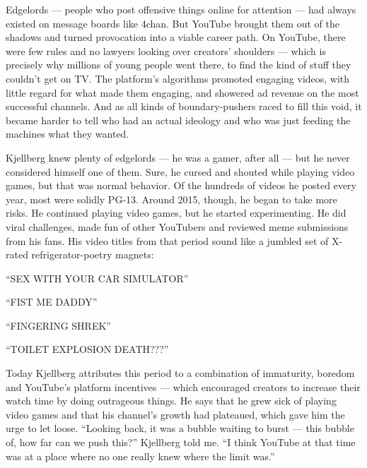 Edgelords --- people who post offensive things online for attention ---
had always existed on message boards like 4chan. But YouTube brought
them out of the shadows and turned provocation into a viable career
path. On YouTube, there were few rules and no lawyers looking over
creators' shoulders --- which is precisely why millions of young people
went there, to find the kind of stuff they couldn't get on TV. The
platform's algorithms promoted engaging videos, with little regard for
what made them engaging, and showered ad revenue on the most successful
channels. And as all kinds of boundary-pushers raced to fill this void,
it became harder to tell who had an actual ideology and who was just
feeding the machines what they wanted.

Kjellberg knew plenty of edgelords --- he was a gamer, after all --- but
he never considered himself one of them. Sure, he cursed and shouted
while playing video games, but that was normal behavior. Of the hundreds
of videos he posted every year, most were solidly PG-13. Around 2015,
though, he began to take more risks. He continued playing video games,
but he started experimenting. He did viral challenges, made fun of other
YouTubers and reviewed meme submissions from his fans. His video titles
from that period sound like a jumbled set of X-rated refrigerator-poetry
magnets:

``SEX WITH YOUR CAR SIMULATOR''

``FIST ME DADDY''

``FINGERING SHREK''

``TOILET EXPLOSION DEATH???''

Today Kjellberg attributes this period to a combination of immaturity,
boredom and YouTube's platform incentives --- which encouraged creators
to increase their watch time by doing outrageous things. He says that he
grew sick of playing video games and that his channel's growth had
plateaued, which gave him the urge to let loose. ``Looking back, it was
a bubble waiting to burst --- this bubble of, how far can we push
this?'' Kjellberg told me. ``I think YouTube at that time was at a place
where no one really knew where the limit was.''


